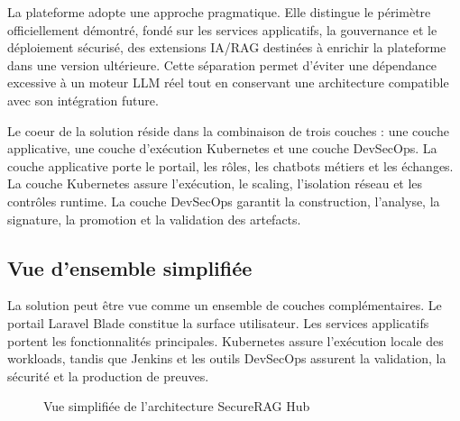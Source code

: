La plateforme adopte une approche pragmatique. Elle distingue le périmètre officiellement démontré, fondé sur les services applicatifs, la gouvernance et le déploiement sécurisé, des extensions IA/RAG destinées à enrichir la plateforme dans une version ultérieure. Cette séparation permet d’éviter une dépendance excessive à un moteur LLM réel tout en conservant une architecture compatible avec son intégration future.

Le coeur de la solution réside dans la combinaison de trois couches : une couche applicative, une couche d’exécution Kubernetes et une couche DevSecOps. La couche applicative porte le portail, les rôles, les chatbots métiers et les échanges. La couche Kubernetes assure l’exécution, le scaling, l’isolation réseau et les contrôles runtime. La couche DevSecOps garantit la construction, l’analyse, la signature, la promotion et la validation des artefacts.

\subsection{Vue d’ensemble simplifiée}

La solution peut être vue comme un ensemble de couches complémentaires. Le portail Laravel Blade constitue la surface utilisateur. Les services applicatifs portent les fonctionnalités principales. Kubernetes assure l’exécution locale des workloads, tandis que Jenkins et les outils DevSecOps assurent la validation, la sécurité et la production de preuves.

\begin{figure}[htbp]
    \centering
    \caption{Vue simplifiée de l’architecture SecureRAG Hub}
    \label{fig:vue_simplifiee_securerag}
\end{figure}

